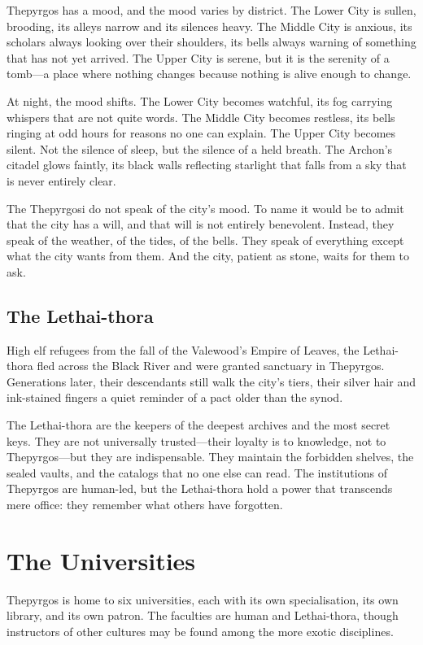 \documentclass[10pt,twocolumn]{book}
\begin{document}
Thepyrgos has a mood, and the mood varies by district. The Lower City is sullen, brooding, its alleys narrow and its silences heavy. The Middle City is anxious, its scholars always looking over their shoulders, its bells always warning of something that has not yet arrived. The Upper City is serene, but it is the serenity of a tomb---a place where nothing changes because nothing is alive enough to change.

At night, the mood shifts. The Lower City becomes watchful, its fog carrying whispers that are not quite words. The Middle City becomes restless, its bells ringing at odd hours for reasons no one can explain. The Upper City becomes silent. Not the silence of sleep, but the silence of a held breath. The Archon's citadel glows faintly, its black walls reflecting starlight that falls from a sky that is never entirely clear.

The Thepyrgosi do not speak of the city's mood. To name it would be to admit that the city has a will, and that will is not entirely benevolent. Instead, they speak of the weather, of the tides, of the bells. They speak of everything except what the city wants from them. And the city, patient as stone, waits for them to ask.

\subsection{The Lethai-thora}

High elf refugees from the fall of the Valewood's Empire of Leaves, the Lethai-thora fled across the Black River and were granted sanctuary in Thepyrgos. Generations later, their descendants still walk the city's tiers, their silver hair and ink-stained fingers a quiet reminder of a pact older than the synod.

The Lethai-thora are the keepers of the deepest archives and the most secret keys. They are not universally trusted---their loyalty is to knowledge, not to Thepyrgos---but they are indispensable. They maintain the forbidden shelves, the sealed vaults, and the catalogs that no one else can read. The institutions of Thepyrgos are human-led, but the Lethai-thora hold a power that transcends mere office: they remember what others have forgotten.

\section{The Universities}
Thepyrgos is home to six universities, each with its own specialisation, its own library, and its own patron. The faculties are human and Lethai-thora, though instructors of other cultures may be found among the more exotic disciplines.
\end{document}
